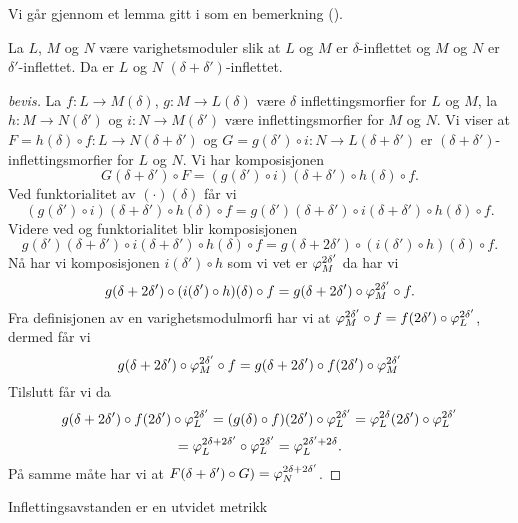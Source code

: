Vi går gjennom et lemma gitt i \cite{Bauer2015a} som en bemerkning (\cite[Remark 3.1]{Bauer2015a}).

\begin{lemma}\label{lem:Inf_Sum}
La $L$, $M$ og $N$ være varighetsmoduler slik at $L$ og $M$ er $\delta$-inflettet og $M$ og $N$ er $\delta'$-inflettet. Da er $L$ og $N$ $(\delta+\delta')$-inflettet.
\end{lemma}
\begin{proof}[bevis]
La $f: L\to M(\delta)$, $g: M\to L(\delta)$ være $\delta$ inflettingsmorfier for $L$ og $M$, la $h: M\to N(\delta')$ og $i: N\to M(\delta')$ være inflettingsmorfier for $M$ og $N$. Vi viser at $F = h(\delta)\circ f:L\to N(\delta+\delta')$ og $G=g(\delta')\circ i: N\to L(\delta+\delta')$ er $(\delta+\delta')$-inflettingsmorfier for $L$ og $N$. Vi har komposisjonen
\[G(\delta+\delta')\circ F = (g(\delta')\circ i)(\delta+\delta')\circ h(\delta)\circ f.\]
Ved funktorialitet av $(\cdot)(\delta)$ får vi
\[(g(\delta')\circ i)(\delta+\delta')\circ h(\delta)\circ f = g(\delta')(\delta+\delta')\circ i(\delta+\delta')\circ h(\delta)\circ f.\]
Videre ved  og funktorialitet blir komposisjonen
\[g(\delta')(\delta+\delta')\circ i(\delta+\delta')\circ h(\delta)\circ f= g(\delta+2\delta')\circ (i(\delta')\circ h)(\delta)\circ f.\]
Nå har vi komposisjonen $i(\delta')\circ h$ som vi vet er $\varphi^{2\delta'}_M$ da har vi
\[g(\delta+2\delta')\circ (i(\delta')\circ h)(\delta)\circ f=g(\delta+2\delta')\circ\varphi_M^{2\delta'}\circ f.\]
Fra definisjonen av en varighetsmodulmorfi har vi at $\varphi_M^{2\delta'}\circ f=f(2\delta')\circ\varphi_L^{2\delta'}$, dermed får vi
\[g(\delta+2\delta')\circ\varphi_M^{2\delta'}\circ f=g(\delta+2\delta')\circ f(2\delta')\circ \varphi_M^{2\delta'}\]
Tilslutt får vi da
\[g(\delta+2\delta')\circ f(2\delta')\circ \varphi_L^{2\delta'}=(g(\delta)\circ f)(2\delta')\circ\varphi_L^{2\delta'} = \varphi_L^{2\delta}(2\delta')\circ \varphi_L^{2\delta'}\]
\[=\varphi_L^{2\delta+2\delta'}\circ \varphi_L^{2\delta'}=\varphi_L^{2\delta'+2\delta}.\]
På samme måte har vi at $F(\delta+\delta')\circ G)=\varphi_N^{2\delta+2\delta'}$.
\end{proof}

\begin{teorem}\label{trm:Utvidet-Metrikk}
  Inflettingsavstanden er en utvidet metrikk
\end{teorem}

